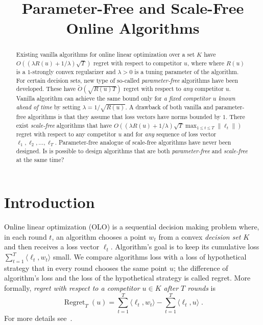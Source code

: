 \documentclass{colt2016} %
\title{Parameter-Free and Scale-Free Online Algorithms}
\DeclareMathOperator{\Regret}{Regret}
\newcommand{\norm}[1]{\left\|{#1}\right\|}
\begin{document}
\maketitle

\begin{abstract}
Existing vanilla algorithms for online linear optimization over a set $K$ have
$O((\lambda R(u) + 1/\lambda) \sqrt{T})$ regret with respect to  competitor $u$,
where where $R(u)$ is a $1$-strongly convex regularizer and $\lambda > 0$ is a
tuning parameter of the algorithm. For certain decision sets, new type of
so-called \emph{parameter-free} algorithms have been developed. These have
$\widetilde O(\sqrt{R(u) T})$ regret with respect to \emph{any} competitor $u$.
Vanilla algorithm can achieve the same bound only for \emph{a fixed competitor
$u$ known ahead of time} by setting $\lambda = 1/\sqrt{R(u)}$. A drawback of
both vanilla and parameter-free algorithms is that they assume that loss vectors
have norms bounded by $1$. There exist \emph{scale-free} algorithms that have
$O((\lambda R(u) + 1/\lambda) \sqrt{T} \max_{1 \le t \le T} \norm{\ell_t})$
regret with respect to any competitor $u$ and for \emph{any} sequence of loss
vector $\ell_1, \ell_2, \dots, \ell_T$. Parameter-free analogue of scale-free
algorithms have never been designed. Is is possible to design algorithms that
are both \emph{parameter-free} and \emph{scale-free} at the same time?
\end{abstract}

\section{Introduction}

Online linear optimization (OLO) is a sequential decision making problem where,
in each round $t$, an algorithm chooses a point $w_t$ from a convex
\emph{decision set} $K$ and then receives a loss vector $\ell_t$. Algorithm's
goal is to keep its cumulative loss $\sum_{t=1}^T \langle \ell_t, w_t \rangle$
small. We compare algorithms loss with a loss of hypothetical strategy that in
every round chooses the same point $u$; the difference of algorithm's  loss and
the loss of the hypothetical strategy is called regret. More formally,
\emph{regret with respect to a competitor $u \in K$ after $T$ rounds} is
$$
\Regret_T(u) = \sum_{t=1}^T \langle \ell_t, w_t \rangle - \sum_{t=1}^T \langle \ell_t, u \rangle \; .
$$
For more details see~\cite{Cesa-Bianchi-Lugosi-2006, Shalev-Shwartz-2011}.
\end{document}

